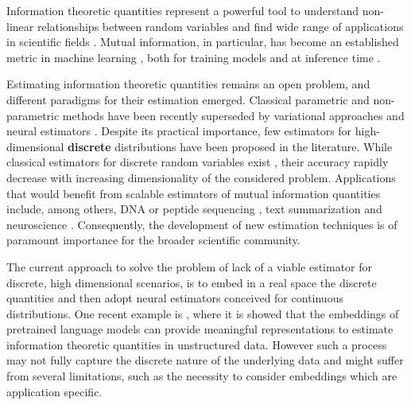 Information theoretic quantities represent a powerful tool to understand non-linear relationships between random variables \citep{shannon1948mathematical, mackay2003information} and find wide range of applications in scientific fields \citep{Karbowski_2024, Eckford_2016}. Mutual information, in particular, has become an established metric in machine learning \citep{bell1995information, stratos2018mutual, belghazi2018mine, oord2019representation, hjelm2019learning}, both for training models \citep{alemi2019deep, chen2016infogan, zhao2018information} and at inference time \citep{alemi2019gilbo, huang2020evaluating}.

Estimating information theoretic quantities remains an open problem, and different paradigms for their estimation emerged. Classical parametric and non-parametric methods \citep{pizer1987adaptive, moon1995estimation, kraskov2004estimating, gao2015efficient} have been recently superseded by variational approaches \citep{barber2004algorithm, nguyen2007neurips, nowozin2016neurips, poole2019variational, wunder2021reverse, letizia2023variational, federici2023effectiveness} and neural estimators \citep{papamakarios2017masked, belghazi2018mine, oord2019representation, song2019, rhodes2020telescoping, letizia2022copula, brekelmans2023improving,franzese2023minde,butakov2024mutual}. Despite its practical importance, few estimators for high-dimensional \textbf{discrete} distributions have been proposed in the literature. While classical estimators for discrete random variables exist \citep{pinchas2024comparative}, their accuracy rapidly decrease with increasing dimensionality of the considered problem. Applications that would benefit from scalable estimators of mutual information quantities include, among others, DNA or peptide sequencing \citep{newcomb2021use, xiaadanovo}, text summarization \citep{darrin2024textttcosmicmutualinformationtaskagnostic} and neuroscience \citep{chai2009exploring}. Consequently, the development of new estimation techniques is of paramount importance for the broader scientific community.

The current approach to solve the problem of lack of a viable estimator for discrete, high dimensional scenarios, is to embed in a real space the discrete quantities and then adopt neural estimators conceived for continuous distributions. One recent example is \citep{lee2024benchmarksuiteevaluatingneural}, where it is showed that the embeddings of pretrained language models can provide meaningful representations to estimate information theoretic quantities in unstructured data. However such a process may not fully capture the discrete nature of the underlying data and might suffer from several limitations, such as the necessity to consider embeddings which are application specific.

